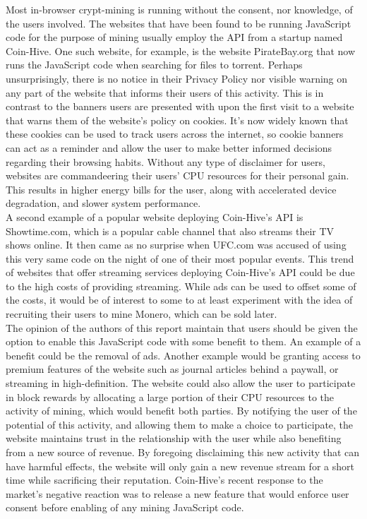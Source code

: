 Most in-browser crypt-mining is running without the consent, nor knowledge, of the users involved. The websites that have been found to be running JavaScript code for the purpose of mining usually employ the API from a startup named Coin-Hive. One such website, for example, is the website PirateBay.org that now runs the JavaScript code when searching for files to torrent. Perhaps unsurprisingly, there is no notice in their Privacy Policy nor visible warning on any part of the website that informs their users of this activity. This is in contrast to the banners users are presented with upon the first visit to a website that warns them of the website’s policy on cookies. It’s now widely known that these cookies can be used to track users across the internet, so cookie banners can act as a reminder and allow the user to make better informed decisions regarding their browsing habits. Without any type of disclaimer for users, websites are commandeering their users’ CPU resources for their personal gain. This results in higher energy bills for the user, along with accelerated device degradation, and slower system performance.
\\
A second example of a popular website deploying Coin-Hive’s API is Showtime.com, which is a popular cable channel that also streams their TV shows online. It then came as no surprise when UFC.com was accused of using this very same code on the night of one of their most popular events. This trend of websites that offer streaming services deploying Coin-Hive’s API could be due to the high costs of providing streaming. While ads can be used to offset some of the costs, it would be of interest to some to at least experiment with the idea of recruiting their users to mine Monero, which can be sold later.
\\
The opinion of the authors of this report maintain that users should be given the option to enable this JavaScript code with some benefit to them. An example of a benefit could be the removal of ads. Another example would be granting access to premium features of the website such as journal articles behind a paywall, or streaming in high-definition. The website could also allow the user to participate in block rewards by allocating a large portion of their CPU resources to the activity of mining, which would benefit both parties. By notifying the user of the potential of this activity, and allowing them to make a choice to participate, the website maintains trust in the relationship with the user while also benefiting from a new source of revenue. By foregoing disclaiming this new activity that can have harmful effects, the website will only gain a new revenue stream for a short time while sacrificing their reputation. Coin-Hive’s recent response to the market’s negative reaction was to release a new feature that would enforce user consent before enabling of any mining JavaScript code. 
